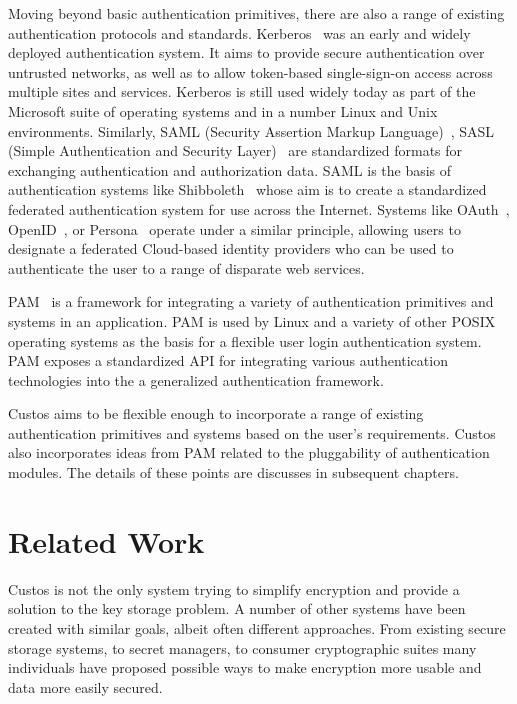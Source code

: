 Moving beyond basic authentication primitives, there are also a range
of existing authentication protocols and
standards. Kerberos~\cite{Kohl1994, Neuman1994} was an early and
widely deployed authentication system. It aims to provide secure
authentication over untrusted networks, as well as to allow
token-based single-sign-on access across multiple sites and
services. Kerberos is still used widely today as part of the Microsoft
suite of operating systems and in a number Linux and Unix
environments. Similarly, SAML (Security Assertion Markup
Language)~\cite{saml}, SASL (Simple Authentication and Security
Layer)~\cite{sasl} are standardized formats for exchanging
authentication and authorization data. SAML is the basis of
authentication systems like Shibboleth~\cite{shibboleth, Leandro2012}
whose aim is to create a standardized federated authentication system
for use across the Internet. Systems like OAuth~\cite{oauth},
OpenID~\cite{openid}, or Persona~\cite{persona} operate under a
similar principle, allowing users to designate a federated Cloud-based
identity providers who can be used to authenticate the user to a range
of disparate web services.

PAM~\cite{linux-pam, openpam} is a framework for integrating a variety
of authentication primitives and systems in an application. PAM is
used by Linux and a variety of other POSIX operating systems as the
basis for a flexible user login authentication system. PAM exposes a
standardized API for integrating various authentication technologies
into the a generalized authentication framework.

Custos aims to be flexible enough to incorporate a range of existing
authentication primitives and systems based on the user's
requirements. Custos also incorporates ideas from PAM related to the
pluggability of authentication modules. The details of these points
are discusses in subsequent chapters.

\section{Related Work}

Custos is not the only system trying to simplify encryption and
provide a solution to the key storage problem. A number of other
systems have been created with similar goals, albeit often different
approaches. From existing secure storage systems, to secret managers,
to consumer cryptographic suites many individuals have proposed
possible ways to make encryption more usable and data more easily
secured.

